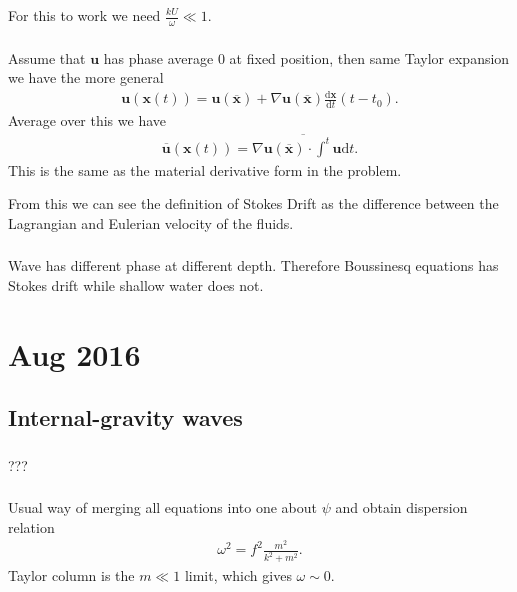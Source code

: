\documentclass[11pt,letterpaper]{book}
\theoremstyle{definition}
\newcommand{\de}{\mathrm{d}}
\newcommand{\dsp}{\displaystyle}
\newcommand{\ve}[1]{\boldsymbol{#1}}
\begin{document}
For this to work we need $\dsp{\frac{kU}{\omega}\ll 1}$.

\subsection{}
Assume that $\ve u$ has phase average 0 at fixed position, then same Taylor expansion we have the more general
\begin{align*}
    \ve u(\ve x(t)) = \ve u(\overline{\ve x})+\nabla\ve u(\overline{\ve x})\frac{\de \ve x}{\de t}(t-t_0).
\end{align*}
Average over this we have
\begin{align*}
    \overline{\ve u}(\ve x(t)) = \overline{\nabla\ve u(\overline{\ve x})\cdot \int^t \ve u\de t}.
\end{align*}
This is the same as the material derivative form in the problem. 

From this we can see the definition of Stokes Drift as the difference between the Lagrangian and Eulerian velocity of the fluids. 

\subsection{}
Wave has different phase at different depth. Therefore Boussinesq equations has Stokes drift while shallow water does not. 


\chapter{Aug 2016}
\section{Internal-gravity waves}\label{prob:aug_2016_1}
\subsection{}
???

\subsection{}
Usual way of merging all equations into one about $\psi$ and obtain dispersion relation
\begin{align*}
    \omega^2 = f^2\frac{m^2}{k^2+m^2}.
\end{align*}
Taylor column is the $m\ll 1$ limit, which gives $\omega\sim 0$.
\end{document}

